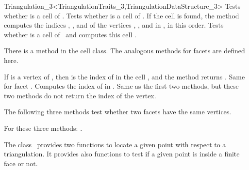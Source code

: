 \begin{ccRefClass}{Triangulation_3<TriangulationTraits_3,TriangulationDataStructure_3>}
{Tests whether  is a cell of \ccVar.}
\ccGlue
{}
{Tests whether  is a cell of \ccVar. 
If the cell  is found, the method
computes the indices , ,  and  of the
vertices , ,  and  in , in this
order. 
}
\ccGlue
{}
{Tests whether  is a cell of \ccVar\ and computes 
this cell .
}

There is a method  in the cell class. The analogous
methods for facets are defined here.

{If  is a vertex of , then  is the index of
 in the cell , and the method returns .
}
\ccGlue
{}
{Same for facet . Computes the index  of  in
.}
\ccGlue
{}
{}
\ccGlue
{}
{Same as the first two methods, but these two methods do not return the
index of the vertex.}

The following three methods test whether two facets have the same
vertices.

{}
\ccGlue
{}
{}
\ccGlue
{}
{For these three methods: .}



The class \ccClassTemplateName\  provides two functions to locate
a given point with respect to a triangulation. It provides
also functions to test if a given point is inside a finite face
or not.


\end{ccRefClass}
